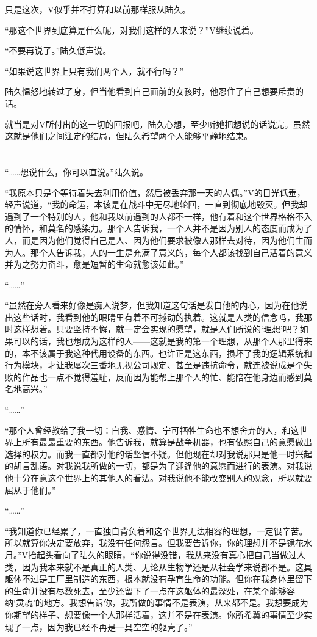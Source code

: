 只是这次，V似乎并不打算和以前那样服从陆久。

“那这个世界到底算是什么呢，对我们这样的人来说？”V继续说着。

“不要再说了。”陆久低声说。

“如果说这世界上只有我们两个人，就不行吗？”

陆久愠怒地转过了身，但当他看到自己面前的女孩时，他忍住了自己想要斥责的话。

就当是对V所付出的这一切的回报吧，陆久心想，至少听她把想说的话说完。虽然这就是他们之间注定的结局，但陆久希望两个人能够平静地结束。

\section*{}

“……想说什么，你可以直说。”陆久说。

“我原本只是个等待着失去利用价值，然后被丢弃那一天的人偶。”V的目光低垂，轻声说道，“我的命运，本该是在战斗中无尽地轮回，一直到彻底地毁灭。但我却遇到了一个特别的人，他和我以前遇到的人都不一样，他有着和这个世界格格不入的情怀，和莫名的感染力。那个人告诉我，一个人并不是因为别人的态度而成为了人，而是因为他们觉得自己是人、因为他们要求被像人那样去对待，因为他们生而为人。那个人告诉我，人的一生是充满了意义的，每个人都该找到自己活着的意义并为之努力奋斗，愈是短暂的生命就愈该如此。”

“……”

“虽然在旁人看来好像是痴人说梦，但我知道这句话是发自他的内心，因为在他说出这些话时，我看到他的眼睛里有着不可撼动的执着。这就是人类的信念吗，我那时这样想着。只要坚持不懈，就一定会实现的愿望，就是人们所说的‘理想’吧？如果可以的话，我也想成为这样的人——这就是我的第一个理想，从那个人那里得来的，本不该属于我这种代用设备的东西。也许正是这东西，损坏了我的逻辑系统和行为模块，才让我屡次三番地无视公司规定、甚至是违抗命令，就连被说成是个失败的作品也一点不觉得羞耻，反而因为能帮上那个人的忙、能陪在他身边而感到莫名地高兴。”

“……”

“那个人曾经教给了我一切：自我、感情、宁可牺牲生命也不想舍弃的人，和这世界上所有最最重要的东西。他告诉我，就算是战争机器，也有依照自己的意愿做出选择的权力。而我一直都对他的话坚信不疑。但他现在却对我说那只是他一时兴起的胡言乱语。对我说我所做的一切，都是为了迎逢他的意愿而进行的表演。对我说他十分在意这个世界上的其他人的看法。对我说他不能改变别人的观念，所以就要屈从于他们。”

“……”

“我知道你已经累了，一直独自背负着和这个世界无法相容的理想，一定很辛苦。所以就算你决定要放弃，我没有任何怨言。但我要告诉你，你的理想并不是镜花水月。”V抬起头看向了陆久的眼睛，“你说得没错，我从来没有真心把自己当做过人类，因为我本来就不是真正的人类、无论从生物学还是从社会学来说都不是。这具躯体不过是工厂里制造的东西，根本就没有孕育生命的功能。但你在我身体里留下的生命并没有尽数死去，至少还留下了一点在这躯体的最深处，在某个能够容纳‘灵魂’的地方。我想告诉你，我所做的事情不是表演，从来都不是。我想要成为你期望的样子、想要像一个人那样活着，这并不是在表演。你所希冀的事情至少实现了一点，因为我已经不再是一具空空的躯壳了。”

